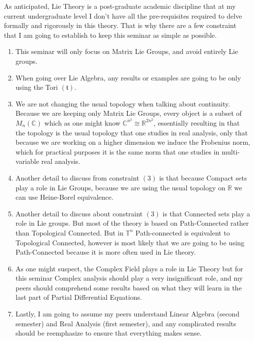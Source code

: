 \begin{assignment}[
  header=HeaderA,
  body=BodyA,
  title={Guia de Projecto},
  duedate={\today},
  toc=false,
  toctitle={},
  exlist=false
]
As anticipated, Lie Theory is a post-graduate academic discipline that at my current undergraduate level I don't have all the pre-requisites required to delve formally and rigorously in this theory. That is why there are a few constraint that I am going to establish to keep this seminar as simple as possible.
\begin{enumerate}
    \item This seminar will only focus on Matrix Lie Groups, and avoid entirely Lie groups.
    \item When going over Lie Algebra, any results or examples are going to be only using the Tori $(\mathfrak{t})$.
    \item We are not changing the usual topology when talking about continuity. Because we are keeping only Matrix Lie Groups, every object is a subset of $M_n(\mathbb{C})$  which as one might know $\mathbb{C}^{n^2} \cong \mathbb{R}^{2n^2}$, essentially resulting in that the topology is the usual topology that one studies in real analysis, only that because we are working on a higher dimension we induce the Frobenius norm, which for practical purposes it is the same norm that one studies in multi-variable real analysis.
    \item Another detail to discuss from constraint $(3)$ is that because Compact sets play a role in Lie Groups, because we are using the usual topology on $\mathbb{R}$ we can use Heine-Borel equivalence.
    \item Another detail to discuss about constraint $(3)$ is that Connected sets play a role in Lie groups. But most of the theory is based on Path-Connected rather than Topological Connected. But in $\mathbb{T}^n$ Path-connected is equivalent to Topological Connected, however is most likely that we are going to be using Path-Connected because it is more often used in Lie theory.
    \item As one might suspect, the Complex Field plays a role in Lie Theory but for this seminar Complex analysis should play a very insignificant role, and my peers should comprehend some results based on what they will learn in the last part of Partial Differential Equations.
    \item Lastly, I am going to assume my peers understand Linear Algebra (second semester) and Real Analysis (first semester), and any complicated results should be reemphasize to ensure that everything makes sense.
\end{enumerate}
    





\end{assignment}
